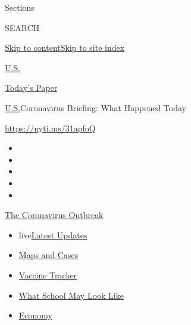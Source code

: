 Sections

SEARCH

\protect\hyperlink{site-content}{Skip to
content}\protect\hyperlink{site-index}{Skip to site index}

\href{https://www.nytimes.com/section/us}{U.S.}

\href{https://myaccount.nytimes.com/auth/login?response_type=cookie\&client_id=vi}{}

\href{https://www.nytimes.com/section/todayspaper}{Today's Paper}

\href{/section/us}{U.S.}\textbar{}Coronavirus Briefing: What Happened
Today

\url{https://nyti.ms/31apfoQ}

\begin{itemize}
\item
\item
\item
\item
\item
\end{itemize}

\href{https://www.nytimes.com/news-event/coronavirus?action=click\&pgtype=Article\&state=default\&region=TOP_BANNER\&context=storylines_menu}{The
Coronavirus Outbreak}

\begin{itemize}
\tightlist
\item
  live\href{https://www.nytimes.com/2020/08/01/world/coronavirus-covid-19.html?action=click\&pgtype=Article\&state=default\&region=TOP_BANNER\&context=storylines_menu}{Latest
  Updates}
\item
  \href{https://www.nytimes.com/interactive/2020/us/coronavirus-us-cases.html?action=click\&pgtype=Article\&state=default\&region=TOP_BANNER\&context=storylines_menu}{Maps
  and Cases}
\item
  \href{https://www.nytimes.com/interactive/2020/science/coronavirus-vaccine-tracker.html?action=click\&pgtype=Article\&state=default\&region=TOP_BANNER\&context=storylines_menu}{Vaccine
  Tracker}
\item
  \href{https://www.nytimes.com/interactive/2020/07/29/us/schools-reopening-coronavirus.html?action=click\&pgtype=Article\&state=default\&region=TOP_BANNER\&context=storylines_menu}{What
  School May Look Like}
\item
  \href{https://www.nytimes.com/live/2020/07/31/business/stock-market-today-coronavirus?action=click\&pgtype=Article\&state=default\&region=TOP_BANNER\&context=storylines_menu}{Economy}
\end{itemize}

